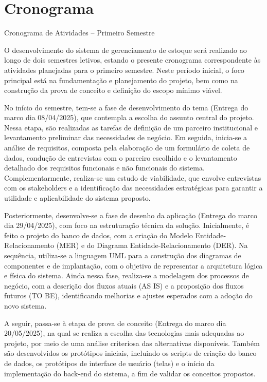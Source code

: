 \documentclass[
	12pt,				%
	openany,			%
	twoside,			%
	a4paper,			%
	english,			%
	brazil				%
	]{abntex2}
\begin{document}

\section{Cronograma}

Cronograma de Atividades – Primeiro Semestre

O desenvolvimento do sistema de gerenciamento de estoque será realizado ao longo de dois semestres letivos, estando o presente cronograma correspondente às atividades planejadas para o primeiro semestre. Neste período inicial, o foco principal está na fundamentação e planejamento do projeto, bem como na construção da prova de conceito e definição do escopo mínimo viável.

No início do semestre, tem-se a fase de desenvolvimento do tema (Entrega do marco dia 08/04/2025), que contempla a escolha do assunto central do projeto. Nessa etapa, são realizadas as tarefas de definição de um parceiro institucional e levantamento preliminar das necessidades de negócio. Em seguida, inicia-se a análise de requisitos, composta pela elaboração de um formulário de coleta de dados, condução de entrevistas com o parceiro escolhido e o levantamento detalhado dos requisitos funcionais e não funcionais do sistema. Complementarmente, realiza-se um estudo de viabilidade, que envolve entrevistas com os stakeholders e a identificação das necessidades estratégicas para garantir a utilidade e aplicabilidade do sistema proposto.

Posteriormente, desenvolve-se a fase de desenho da aplicação (Entrega do marco dia 29/04/2025), com foco na estruturação técnica da solução. Inicialmente, é feito o projeto do banco de dados, com a criação do Modelo Entidade-Relacionamento (MER) e do Diagrama Entidade-Relacionamento (DER). Na sequência, utiliza-se a linguagem UML para a construção dos diagramas de componentes e de implantação, com o objetivo de representar a arquitetura lógica e física do sistema. Ainda nessa fase, realiza-se a modelagem dos processos de negócio, com a descrição dos fluxos atuais (AS IS) e a proposição dos fluxos futuros (TO BE), identificando melhorias e ajustes esperados com a adoção do novo sistema.

A seguir, passa-se à etapa de prova de conceito (Entrega do marco dia 20/05/2025), na qual se realiza a escolha das tecnologias mais adequadas ao projeto, por meio de uma análise criteriosa das alternativas disponíveis. Também são desenvolvidos os protótipos iniciais, incluindo os scripts de criação do banco de dados, os protótipos de interface de usuário (telas) e o início da implementação do back-end do sistema, a fim de validar os conceitos propostos.
\end{document}

